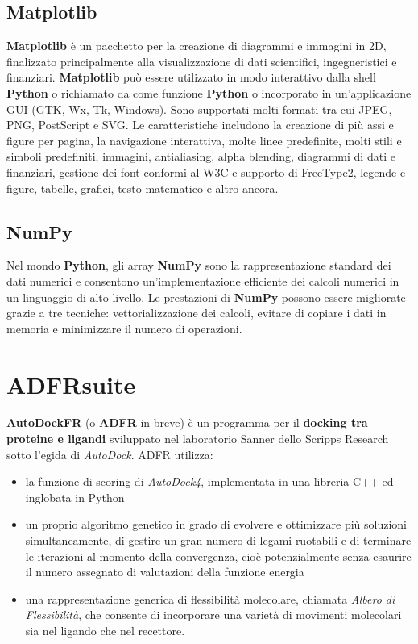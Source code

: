\subsection{Matplotlib}
\textbf{Matplotlib} è un pacchetto per la creazione di diagrammi e immagini in 2D, finalizzato principalmente alla visualizzazione di dati scientifici, ingegneristici e finanziari. \textbf{Matplotlib} può essere utilizzato in modo interattivo dalla shell \textbf{Python} o richiamato da come funzione \textbf{Python} o incorporato in un'applicazione GUI (GTK, Wx, Tk, Windows). Sono supportati molti formati tra cui JPEG, PNG, PostScript e SVG. Le caratteristiche includono la creazione di più assi e figure per pagina, la navigazione interattiva, molte linee predefinite, molti stili e simboli predefiniti, immagini, antialiasing, alpha blending, diagrammi di dati e finanziari, gestione dei font conformi al W3C e supporto di FreeType2, legende e figure, tabelle, grafici, testo matematico e altro ancora\cite{barrett2005matplotlib}.

\subsection{NumPy}
Nel mondo \textbf{Python}, gli array \textbf{NumPy} sono la rappresentazione standard dei dati numerici e consentono un'implementazione efficiente dei calcoli numerici in un linguaggio di alto livello. Le prestazioni di \textbf{NumPy} possono essere migliorate grazie a tre tecniche: vettorializzazione dei calcoli, evitare di copiare i dati in memoria e minimizzare il numero di operazioni\cite{van2011numpy}.

\section{ADFRsuite}
\textbf{AutoDockFR} (o \textbf{ADFR} in breve) è un programma per il \textbf{docking tra proteine e ligandi} sviluppato nel laboratorio Sanner dello Scripps Research sotto l'egida di \textit{AutoDock}.\newline
ADFR utilizza:

\begin{itemize}
    \item la funzione di scoring di \textit{AutoDock4}, implementata in una libreria C++ ed inglobata in Python
    \item un proprio algoritmo genetico in grado di evolvere e ottimizzare più soluzioni simultaneamente, di gestire un gran numero di legami ruotabili e di terminare le iterazioni al momento della convergenza, cioè potenzialmente senza esaurire il numero assegnato di valutazioni della funzione energia
    \item una rappresentazione generica di flessibilità molecolare, chiamata \textit{Albero di Flessibilità}, che consente di incorporare una varietà di movimenti molecolari sia nel ligando che nel recettore.
\end{itemize}

